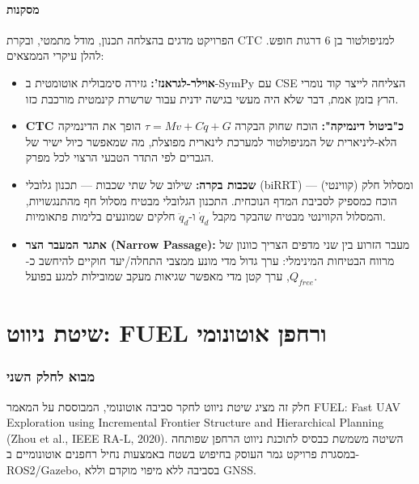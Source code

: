 \documentclass[11pt,a4paper]{article}
\begin{document}
\subsection{מסקנות}
הפרויקט מדגים בהצלחה תכנון, מודל מתמטי, ובקרת \textenglish{CTC} למניפולטור בן 6 דרגות חופש. להלן עיקרי הממצאים:

\begin{itemize}
    \item \textbf{אוילר-לגראנז':} גזירה סימבולית אוטומטית ב-\textenglish{SymPy} עם \textenglish{CSE} הצליחה לייצר קוד נומרי הרץ בזמן אמת, דבר שלא היה מעשי בגישה ידנית עבור שרשרת קינמטית מורכבת כזו.

    \item \textbf{CTC כ"ביטול דינמיקה":} הוכח שחוק הבקרה $\tau = M v + C\dot{q} + G$ הופך את הדינמיקה הלא-ליניארית של המניפולטור למערכת לינארית מפוצלת, מה שמאפשר כיול ישיר של הגברים לפי התדר הטבעי הרצוי לכל מפרק.

    \item \textbf{שכבות בקרה:} שילוב של שתי שכבות — תכנון גלובלי (\textenglish{biRRT}) ומסלול חלק (קווינטי) — הוכח כמספיק לסביבת המדף הנוכחית. התכנון הגלובלי מבטיח מסלול חף מהתנגשויות, והמסלול הקווינטי מבטיח שהבקר מקבל $\dot{q}_d$ ו-$\ddot{q}_d$ חלקים שמונעים בלימות פתאומיות.

    \item \textbf{אתגר המעבר הצר (\textenglish{Narrow Passage}):} מעבר הזרוע בין שני מדפים הצריך כוונון של מרווח הבטיחות המינימלי: ערך גדול מדי מונע ממצבי התחלה/יעד חוקיים להיחשב כ-$Q_{free}$, ערך קטן מדי מאפשר שגיאות מעקב שמובילות למגע בפועל.
\end{itemize}
\newpage


\part{שיטת ניווט: \textenglish{FUEL} ורחפן אוטונומי}

\section{מבוא לחלק השני}

חלק זה מציג שיטת ניווט לחקר סביבה אוטונומי, המבוססת על המאמר
\textenglish{FUEL: Fast UAV Exploration using Incremental Frontier Structure and Hierarchical Planning}
(Zhou et al., IEEE RA-L, 2020).
השיטה משמשת כבסיס לתוכנת ניווט הרחפן שפותחה במסגרת פרויקט גמר העוסק בחיפוש בשטח באמצעות נחיל רחפנים אוטונומיים ב-\textenglish{ROS2/Gazebo}, בסביבה ללא מיפוי מוקדם וללא \textenglish{GNSS}.
\end{document}
